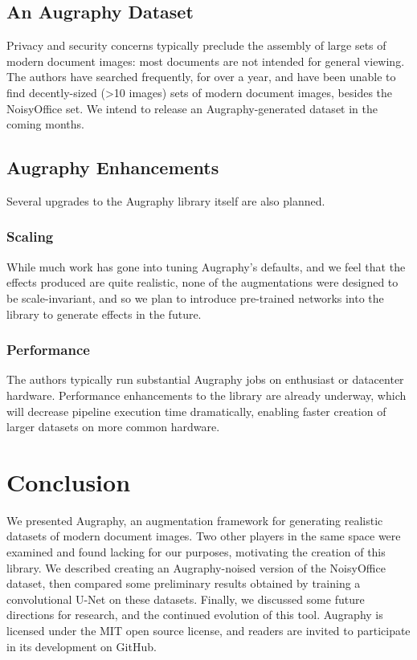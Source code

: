 \documentclass[runningheads]{llncs}
\begin{document}
\subsection{An Augraphy Dataset}
Privacy and security concerns typically preclude the assembly of large sets of modern document images: most documents are not intended for general viewing. The authors have searched frequently, for over a year, and have been unable to find decently-sized (>10 images) sets of modern document images, besides the NoisyOffice set. We intend to release an Augraphy-generated dataset in the coming months.

\subsection{Augraphy Enhancements}
Several upgrades to the Augraphy library itself are also planned.

\subsubsection{Scaling}
While much work has gone into tuning Augraphy's defaults, and we feel that the effects produced are quite realistic, none of the augmentations were designed to be scale-invariant, and so we plan to introduce pre-trained networks into the library to generate effects in the future.

\subsubsection{Performance}
The authors typically run substantial Augraphy jobs on enthusiast or datacenter hardware. Performance enhancements to the library are already underway, which will decrease pipeline execution time dramatically, enabling faster creation of larger datasets on more common hardware.

\section{Conclusion}
We presented Augraphy, an augmentation framework for generating realistic datasets of modern document images. Two other players in the same space were examined and found lacking for our purposes, motivating the creation of this library. We described creating an Augraphy-noised version of the NoisyOffice dataset, then compared some preliminary results obtained by training a convolutional U-Net on these datasets. Finally, we discussed some future directions for research, and the continued evolution of this tool. Augraphy is licensed under the MIT open source license, and readers are invited to participate in its development on GitHub.


%
%
%


\end{document}
